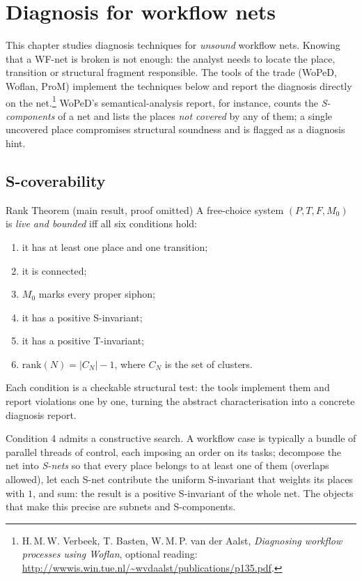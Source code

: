 \section{Diagnosis for workflow nets}

This chapter studies diagnosis techniques for \emph{unsound} workflow nets. Knowing that a WF-net is broken is not enough: the analyst needs to locate the place, transition or structural fragment responsible. The tools of the trade (WoPeD, Woflan, ProM) implement the techniques below and report the diagnosis directly on the net.\footnote{H.\,M.\,W. Verbeek, T. Basten, W.\,M.\,P. van der Aalst, \emph{Diagnosing workflow processes using Woflan}, optional reading: \url{http://wwwis.win.tue.nl/~wvdaalst/publications/p135.pdf}.} WoPeD's semantical-analysis report, for instance, counts the \emph{S-components} of a net and lists the places \emph{not covered} by any of them; a single uncovered place compromises structural soundness and is flagged as a diagnosis hint.

\subsection{S-coverability}

\begin{notebox}{Rank Theorem (main result, proof omitted)}
A free-choice system $(P, T, F, M_0)$ is \emph{live and bounded} iff all six conditions hold:
\begin{enumerate}
  \item it has at least one place and one transition;
  \item it is connected;
  \item $M_0$ marks every proper siphon;
  \item it has a positive S-invariant;
  \item it has a positive T-invariant;
  \item $\mathrm{rank}(N) = |C_N| - 1$, where $C_N$ is the set of clusters.
\end{enumerate}
Each condition is a checkable structural test: the tools implement them and report violations one by one, turning the abstract characterisation into a concrete diagnosis report.
\end{notebox}
Condition 4 admits a constructive search. A workflow case is typically a bundle of parallel threads of control, each imposing an order on its tasks; decompose the net into \emph{S-nets} so that every place belongs to at least one of them (overlaps allowed), let each S-net contribute the uniform S-invariant that weights its places with $1$, and sum: the result is a positive S-invariant of the whole net. The objects that make this precise are subnets and S-components.

